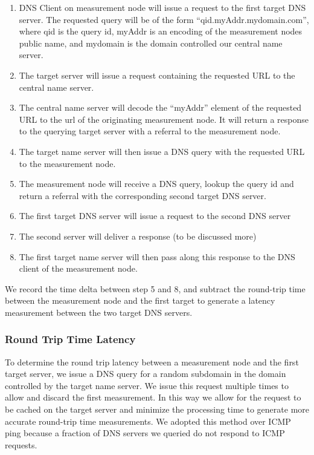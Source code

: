 \begin{enumerate}
\setlength{\itemsep}{1pt}
\setlength{\parskip}{0pt}
\setlength{\parsep}{0pt}
	\item DNS Client on measurement node will issue a request to the first target DNS server. The requested query will be of the form ``qid.myAddr.mydomain.com'', where qid is the query id, myAddr is an encoding of the measurement nodes public name, and mydomain is the domain controlled our central name server.
	\item The target server will issue a request containing the requested URL to the central name server.
	\item The central name server will decode the ``myAddr'' element of the requested URL to the url of the originating measurement node. It will return a response to the querying target server with a referral to the measurement node.
	\item The target name server will then issue a DNS query with the requested URL to the measurement node.
	\item The measurement node will receive a DNS query, lookup the query id and return a referral with the corresponding second target DNS server.
	\item The first target DNS server will issue a request to the second DNS server
	\item The second server will deliver a response (to be discussed more)
	\item The first target name server will then pass along this response to the DNS client of the measurement node.
\end{enumerate}

We record the time delta between step 5 and 8, and subtract the round-trip time between the measurement node and the first target to generate a latency measurement between the two target DNS servers.

\subsubsection{Round Trip Time Latency}
To determine the round trip latency between a measurement node and the first target server, we issue a DNS query for a random subdomain in the domain controlled by the target name server. We issue this request multiple times to allow and discard the first measurement. In this way we allow for the request to be cached on the target server and minimize the processing time to generate more accurate round-trip time measurements. We adopted this method over ICMP ping because a fraction of DNS servers we queried do not respond to ICMP requests.

